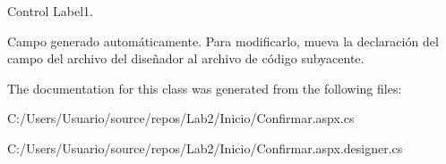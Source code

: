 Control Label1. 

Campo generado automáticamente. Para modificarlo, mueva la declaración del campo del archivo del diseñador al archivo de código subyacente. 

The documentation for this class was generated from the following files\+:\begin{DoxyCompactItemize}
\item 
C\+:/\+Users/\+Usuario/source/repos/\+Lab2/\+Inicio/Confirmar.\+aspx.\+cs\item 
C\+:/\+Users/\+Usuario/source/repos/\+Lab2/\+Inicio/Confirmar.\+aspx.\+designer.\+cs\end{DoxyCompactItemize}
